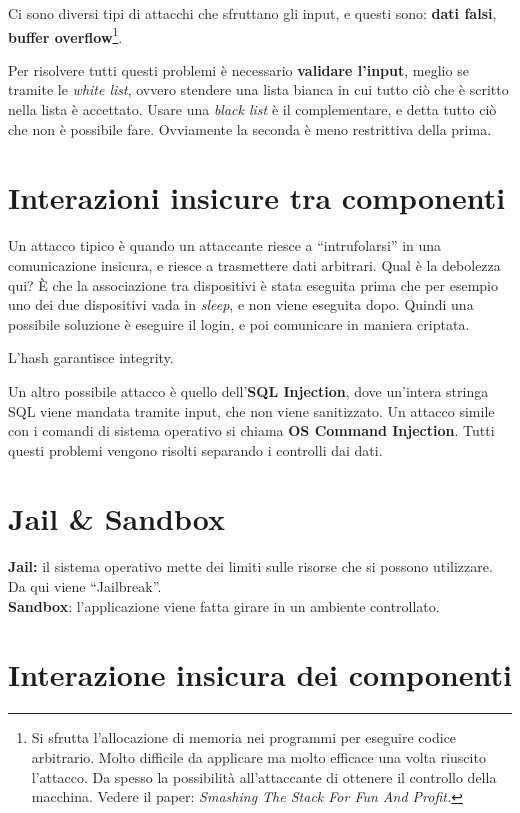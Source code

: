 Ci sono diversi tipi di attacchi che sfruttano gli input, e questi sono: 
\textbf{dati falsi}, \textbf{buffer overflow}\footnote{Si sfrutta l'allocazione 
di memoria nei programmi per eseguire codice arbitrario. Molto difficile da 
applicare ma molto efficace una volta riuscito l'attacco. Da spesso la 
possibilità all'attaccante di ottenere il controllo della macchina. Vedere il 
paper: \textit{Smashing The Stack For Fun And Profit.}}.

Per risolvere tutti questi problemi è necessario \textbf{validare l'input}, 
meglio se tramite le \textit{white list}, ovvero stendere una lista bianca in 
cui tutto ciò che è scritto nella lista è accettato. Usare una \textit{black 
list} è il complementare, e detta tutto ciò che non è possibile fare.
Ovviamente la seconda è meno restrittiva della prima.

\section{Interazioni insicure tra componenti}

Un attacco tipico è quando un attaccante riesce a ``intrufolarsi'' in una 
comunicazione insicura, e riesce a trasmettere dati arbitrari.
Qual è la debolezza qui? È che la associazione tra dispositivi è stata eseguita 
prima che per esempio uno dei due dispositivi vada in \textit{sleep}, e non 
viene eseguita dopo. Quindi una possibile soluzione è eseguire il login, e poi 
comunicare in maniera criptata.

L'hash garantisce integrity.

Un altro possibile attacco è quello dell'\textbf{SQL Injection}, dove un'intera 
stringa SQL viene mandata tramite input, che non viene sanitizzato. Un attacco 
simile con i comandi di sistema operativo si chiama \textbf{OS Command 
Injection}. Tutti questi problemi vengono risolti separando i controlli dai 
dati.

\section{Jail \& Sandbox}

\textbf{Jail:} il sistema operativo mette dei limiti sulle risorse che si
possono utilizzare.
Da qui viene ``Jailbreak''.\\
\newline
\textbf{Sandbox}: l'applicazione viene fatta girare in un ambiente controllato.


\section{Interazione insicura dei componenti}

